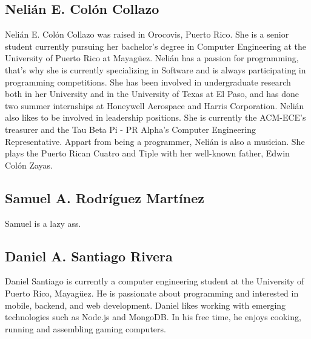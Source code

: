 
\subsection{Nelián E. Colón Collazo}
Nelián E. Colón Collazo was raised in Orocovis, Puerto Rico. She is a senior student currently pursuing her bachelor's degree in Computer Engineering at the University of Puerto Rico at Mayagüez. Nelián has a passion for programming, that's why she is currently specializing in Software and is always participating in programming competitions. She has been involved in undergraduate research both in her University and in the University of Texas at El Paso, and has done two summer internships at Honeywell Aerospace and Harris Corporation. Nelián also likes to be involved in leadership positions. She is currently the ACM-ECE's treasurer and the Tau Beta Pi - PR Alpha's Computer Engineering Representative. Appart from being a programmer, Nelián is also a musician. She plays the Puerto Rican Cuatro and Tiple with her well-known father, Edwin Colón Zayas. 

\subsection{Samuel A. Rodríguez Martínez}
Samuel is a lazy ass. 

\subsection{Daniel A. Santiago Rivera}
Daniel Santiago is currently a computer engineering student at the University of Puerto Rico, Mayagüez. He is passionate about programming and interested in mobile, backend, and web development. Daniel likes working with emerging technologies such as Node.js and MongoDB. In his free time, he enjoys cooking, running and assembling gaming computers.

